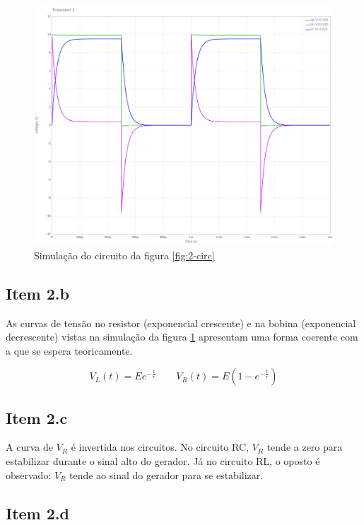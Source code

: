 \documentclass[11pt]{article}
\begin{document}
\begin{figure}[h!]
  \centering
  \includegraphics[width=.8\textwidth]{fig/2-sim}
  \caption{Simulação do circuito da figura \ref{fig:2-circ}}
  \label{fig:2-sim}
\end{figure}


\subsection*{Item 2.b}

As curvas de tensão no resistor (exponencial crescente) e na bobina (exponencial decrescente) vistas na simulação da figura \ref{fig:2-sim} apresentam uma forma coerente com a que se espera teoricamente.

$$
  V_{L}(t) = Ee^{-\frac{t}{\uptau}} \qquad V_{R}(t) = E(1 - e^{-\frac{t}{\uptau}})
$$

\subsection*{Item 2.c}

A curva de $V_{R}$ é invertida nos circuitos. No circuito RC, $V_{R}$ tende a zero para estabilizar durante o sinal alto do gerador. Já no circuito RL, o oposto é observado: $V_{R}$ tende ao sinal do gerador para se estabilizar.

\subsection*{Item 2.d}
\end{document}
